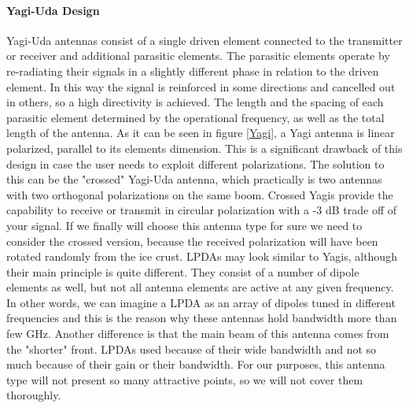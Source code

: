 \paragraph{Yagi-Uda Design}
Yagi-Uda antennas consist of a single driven element connected to the transmitter or receiver and additional parasitic elements. The parasitic elements operate by re-radiating their signals in a slightly different phase in relation to the driven element. In this way the signal is reinforced in some directions and cancelled out in others, so a high directivity is achieved. The length and the spacing of each parasitic element determined by the operational frequency, as well as the total length of the antenna. As it can be seen in figure \ref{Yagi}, a Yagi antenna is linear polarized, parallel to its elements dimension. This is a significant drawback of this design in case the user needs to exploit different polarizations. The solution to this can be the "crossed" Yagi-Uda antenna, which practically is two antennas with two orthogonal polarizations on the same boom. Crossed Yagis provide the capability to receive or transmit in circular polarization with a -3 dB trade off of your signal. If we finally will choose this antenna type for sure we need to consider the crossed version, because the received polarization will have been rotated randomly from the ice crust. LPDAs may look similar to Yagis, although their main principle is quite different. They consist of a number of dipole elements as well, but not all antenna elements are active at any given frequency. In other words, we can imagine a LPDA as an array of dipoles tuned in different frequencies and this is the reason why these antennas hold bandwidth more than few GHz. Another difference is that the main beam of this antenna comes from the "shorter" front. LPDAs used because of their wide bandwidth and not so much because of their gain or their bandwidth. For our purposes, this antenna type will not present so many attractive points, so we will not cover them thoroughly. 

